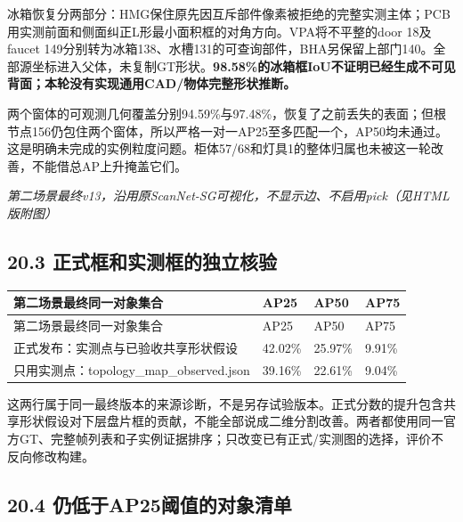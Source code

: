 \documentclass[UTF8,fontset=fandol]{ctexart}
\begin{document}
冰箱恢复分两部分：HMG保住原先因互斥部件像素被拒绝的完整实测主体；PCB用实测前面和侧面纠正L形最小面积框的对角方向。VPA将不平整的door 18及faucet 149分别转为冰箱138、水槽131的可查询部件，BHA另保留上部门140。全部源坐标进入父体，未复制GT形状。\textbf{98.58\%的冰箱框IoU不证明已经生成不可见背面；本轮没有实现通用CAD/物体完整形状推断。}



两个窗体的可观测几何覆盖分别94.59\%与97.48\%，恢复了之前丢失的表面；但根节点156仍包住两个窗体，所以严格一对一AP25至多匹配一个，AP50均未通过。这是明确未完成的实例粒度问题。柜体57/68和灯具1的整体归属也未被这一轮改善，不能借总AP上升掩盖它们。



\textit{第二场景最终v13，沿用原ScanNet-SG可视化，不显示边、不启用pick（见HTML版附图）}



\subsection*{20.3 正式框和实测框的独立核验}

{\small
\begin{longtable}{|p{}|p{}|p{}|p{}|}
\hline
第二场景最终同一对象集合 & AP25 & AP50 & AP75 \\ \hline
\endfirsthead
\hline
第二场景最终同一对象集合 & AP25 & AP50 & AP75 \\ \hline
\endhead
正式发布：实测点与已验收共享形状假设 & 42.02\% & 25.97\% & 9.91\% \\ \hline
只用实测点：topology\_map\_observed.json & 39.16\% & 22.61\% & 9.04\% \\ \hline
\end{longtable}
}

这两行属于同一最终版本的来源诊断，不是另存试验版本。正式分数的提升包含共享形状假设对下层盘片框的贡献，不能全部说成二维分割改善。两者都使用同一官方GT、完整帧列表和子实例证据排序；只改变已有正式/实测图的选择，评价不反向修改构建。



\subsection*{20.4 仍低于AP25阈值的对象清单}
\end{document}
